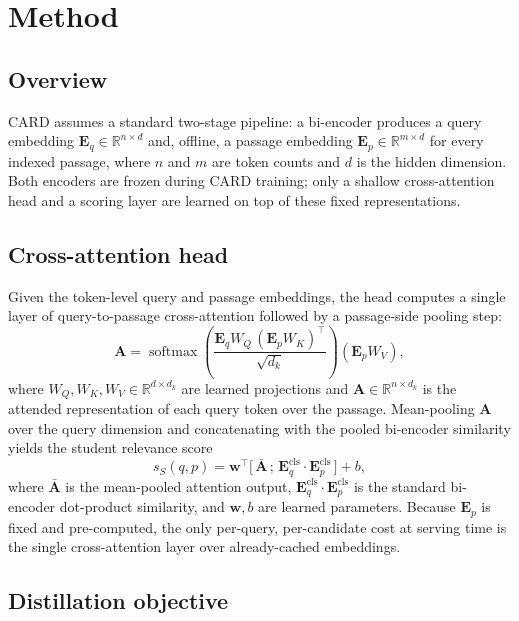 \section{Method}
\label{sec:method}

\subsection{Overview}

CARD assumes a standard two-stage pipeline: a bi-encoder produces a query
embedding $\mathbf{E}_q \in \mathbb{R}^{n \times d}$ and, offline, a passage
embedding $\mathbf{E}_p \in \mathbb{R}^{m \times d}$ for every indexed
passage, where $n$ and $m$ are token counts and $d$ is the hidden dimension.
Both encoders are frozen during CARD training; only a shallow cross-attention
head and a scoring layer are learned on top of these fixed representations.

\subsection{Cross-attention head}

Given the token-level query and passage embeddings, the head computes a
single layer of query-to-passage cross-attention followed by a passage-side
pooling step:
\[
\mathbf{A} = \operatorname{softmax}\!\left(\frac{\mathbf{E}_q W_Q \,(\mathbf{E}_p W_K)^\top}{\sqrt{d_k}}\right)(\mathbf{E}_p W_V),
\]
where $W_Q, W_K, W_V \in \mathbb{R}^{d \times d_k}$ are learned projections
and $\mathbf{A} \in \mathbb{R}^{n \times d_k}$ is the attended representation
of each query token over the passage. Mean-pooling $\mathbf{A}$ over the
query dimension and concatenating with the pooled bi-encoder similarity
yields the student relevance score
\begin{equation}
s_S(q,p) = \mathbf{w}^\top\big[\,\bar{\mathbf{A}} \,;\, \mathbf{E}_q^{\text{cls}} \cdot \mathbf{E}_p^{\text{cls}}\,\big] + b,
\label{eq:score}
\end{equation}
where $\bar{\mathbf{A}}$ is the mean-pooled attention output, $\mathbf{E}_q^{\text{cls}}
\cdot \mathbf{E}_p^{\text{cls}}$ is the standard bi-encoder dot-product
similarity, and $\mathbf{w}, b$ are learned parameters. Because $\mathbf{E}_p$
is fixed and pre-computed, the only per-query, per-candidate cost at serving
time is the single cross-attention layer over already-cached embeddings.

\subsection{Distillation objective}

